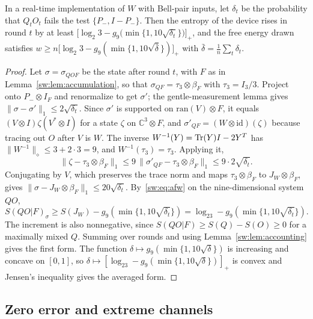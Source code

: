 \begin{proposition}\label{sw:prop:support}
In a real-time implementation of $W$ with Bell-pair inputs, let $\delta_t$ be the probability that $Q_tO_t$ fails the test $\{P_-,I-P_-\}$. Then the entropy of the device rises in round $t$ by at least $\bigl[\log_2 3-g_9\bigl(\min\{1,10\sqrt{\delta_t}\}\bigr)\bigr]_+$, and the free energy drawn satisfies $w\ge n\bigl[\log_2 3-g_9(\min\{1,10\sqrt{\bar\delta}\})\bigr]_+$ with $\bar\delta=\frac1n\sum_t\delta_t$.
\end{proposition}

\begin{proof}
Let $\sigma=\sigma_{QOF}$ be the state after round $t$, with $F$ as in Lemma~\ref{sw:lem:accumulation}, so that $\sigma_{QF}=\tau_3\otimes\beta_F$ with $\tau_3=I_3/3$. Project onto $P_-\otimes I_F$ and renormalize to get $\sigma'$; the gentle-measurement lemma gives $\|\sigma-\sigma'\|_1\le2\sqrt{\delta_t}$. Since $\sigma'$ is supported on $\mathrm{ran}(V)\otimes F$, it equals $(V\otimes I)\zeta(V^*\otimes I)$ for a state $\zeta$ on $\mathbb C^3\otimes F$, and $\sigma'_{QF}=(W\otimes\mathrm{id})(\zeta)$ because tracing out $O$ after $V$ is $W$. The inverse $W^{-1}(Y)=\operatorname{Tr}(Y)I-2Y^T$ has $\|W^{-1}\|_\diamond\le3+2\cdot3=9$, and $W^{-1}(\tau_3)=\tau_3$. Applying it,
\[
\|\zeta-\tau_3\otimes\beta_F\|_1\le9\,\|\sigma'_{QF}-\tau_3\otimes\beta_F\|_1\le9\cdot2\sqrt{\delta_t}.
\]
Conjugating by $V$, which preserves the trace norm and maps $\tau_3\otimes\beta_F$ to $J_W\otimes\beta_F$, gives $\|\sigma-J_W\otimes\beta_F\|_1\le20\sqrt{\delta_t}$. By~\eqref{sw:eq:afw} on the nine-dimensional system $QO$,
\[
S(QO|F)_\sigma\ge S(J_W)-g_9(\min\{1,10\sqrt{\delta_t}\})=\log_23-g_9(\min\{1,10\sqrt{\delta_t}\}).
\] The increment is also nonnegative, since $S(QO|F)\ge S(Q)-S(O)\ge0$ for a maximally mixed $Q$. Summing over rounds and using Lemma~\ref{sw:lem:accounting} gives the first form. The function $\delta\mapsto g_9(\min\{1,10\sqrt\delta\})$ is increasing and concave on $[0,1]$, so $\delta\mapsto[\log_23-g_9(\min\{1,10\sqrt\delta\})]_+$ is convex and Jensen's inequality gives the averaged form.
\end{proof}

\subsection{Zero error and extreme channels}\label{sw:app:extreme}

